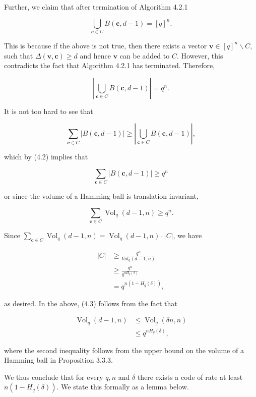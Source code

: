 \documentclass[10pt]{article}
\begin{document}
Further, we claim that after termination of Algorithm 4.2.1

$$
\bigcup_{\mathbf{c} \in C} B(\mathbf{c}, d-1)=[q]^{n} .
$$

This is because if the above is not true, then there exists a vector $\mathbf{v} \in[q]^{n} \backslash C$, such that $\Delta(\mathbf{v}, \mathbf{c}) \geq d$ and hence $\mathbf{v}$ can be added to $C$. However, this contradicts the fact that Algorithm 4.2.1 has terminated. Therefore,


\begin{equation*}
\left|\bigcup_{\mathbf{c} \in C} B(\mathbf{c}, d-1)\right|=q^{n} . \tag{4.2}
\end{equation*}


It is not too hard to see that

$$
\sum_{\mathbf{c} \in C}|B(\mathbf{c}, d-1)| \geq\left|\bigcup_{\mathbf{c} \in C} B(\mathbf{c}, d-1)\right|,
$$

which by (4.2) implies that

$$
\sum_{\mathbf{c} \in C}|B(\mathbf{c}, d-1)| \geq q^{n}
$$

or since the volume of a Hamming ball is translation invariant,

$$
\sum_{\mathbf{c} \in C} \operatorname{Vol}_{q}(d-1, n) \geq q^{n} .
$$

Since $\sum_{\mathbf{c} \in C} \operatorname{Vol}_{q}(d-1, n)=\operatorname{Vol}_{q}(d-1, n) \cdot|C|$, we have


\begin{align*}
|C| & \geq \frac{q^{n}}{V o l_{q}(d-1, n)} \\
& \geq \frac{q^{n}}{q^{n H_{q}(\delta)}}  \tag{4.3}\\
& =q^{n\left(1-H_{q}(\delta)\right)},
\end{align*}


as desired. In the above, (4.3) follows from the fact that


\begin{align*}
\operatorname{Vol}_{q}(d-1, n) & \leq \operatorname{Vol}_{q}(\delta n, n) \\
& \leq q^{n H_{q}(\delta)}, \tag{4.4}
\end{align*}


where the second inequality follows from the upper bound on the volume of a Hamming ball in Proposition 3.3.3.

We thus conclude that for every $q, n$ and $\delta$ there exists a code of rate at least $n\left(1-H_{q}(\delta)\right)$. We state this formally as a lemma below.
\end{document}
